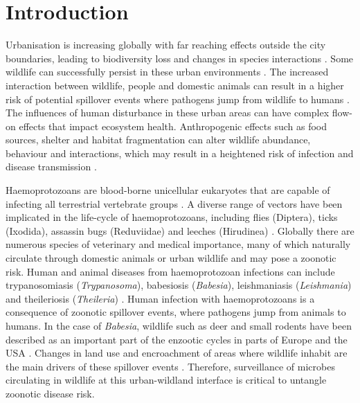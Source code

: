\documentclass[a4paper, nobind]{templates/ociamthesis}
\begin{document}
\hypertarget{introduction-2}{%
\section{Introduction}\label{introduction-2}}

Urbanisation is increasing globally with far reaching effects outside the city boundaries, leading to biodiversity loss and changes in species interactions \autocite{bradleyUrbanizationEcologyWildlife2007}.
Some wildlife can successfully persist in these urban environments \autocite{banksEcologicalImpactsCommensal2015,hillmanUrbanEnvironmentsAlter2017,rothenburgerEnvironmentalFactorsZoonotic2017}.
The increased interaction between wildlife, people and domestic animals can result in a higher risk of potential spillover events where pathogens jump from wildlife to humans \autocite{hosseiniDoesImpactBiodiversity2017}.
The influences of human disturbance in these urban areas can have complex flow-on effects that impact ecosystem health.
Anthropogenic effects such as food sources, shelter and habitat fragmentation can alter wildlife abundance, behaviour and interactions, which may result in a heightened risk of infection and disease transmission \autocite{daszakEmergingInfectiousDiseases2000,bradleyUrbanizationEcologyWildlife2007}.

Haemoprotozoans are blood-borne unicellular eukaryotes that are capable of infecting all terrestrial vertebrate groups \autocite{mcadamInfectiousDiseasesChapter2010}.
A diverse range of vectors have been implicated in the life-cycle of haemoprotozoans, including flies (Diptera), ticks (Ixodida), assassin bugs (Reduviidae) and leeches (Hirudinea) \autocite{odonoghueHaemoprotozoaMakingBiological2017}.
Globally there are numerous species of veterinary and medical importance, many of which naturally circulate through domestic animals or urban wildlife and may pose a zoonotic risk.
Human and animal diseases from haemoprotozoan infections can include trypanosomiasis (\emph{Trypanosoma}), babesiosis (\emph{Babesia}), leishmaniasis (\emph{Leishmania}) and theileriosis (\emph{Theileria}) \autocite{schreegMitochondrialGenomeSequences2016,kostygovEuglenozoaTaxonomyDiversity2021}.
Human infection with haemoprotozoans is a consequence of zoonotic spillover events, where pathogens jump from animals to humans.
In the case of \emph{Babesia}, wildlife such as deer and small rodents have been described as an important part of the enzootic cycles in parts of Europe \autocite{silaghiAnaplasmaPhagocytophilumBabesia2020,fanelliHistoricalReviewBabesia2021} and the USA \autocite{yabsleyNaturalHistoryZoonotic2013,azagiCirculationBabesiaSpecies2021}.
Changes in land use and encroachment of areas where wildlife inhabit are the main drivers of these spillover events \autocite{diuk-wasserImpactLandUse2020,plowrightLandUseinducedSpillover2021}.
Therefore, surveillance of microbes circulating in wildlife at this urban-wildland interface is critical to untangle zoonotic disease risk.
\end{document}
